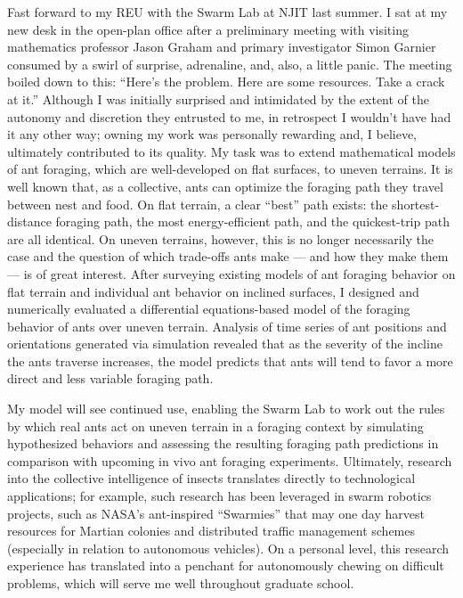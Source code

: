 \documentclass[12pt]{book}
\begin{document}
Fast forward to my REU with the Swarm Lab at NJIT last summer.
I sat at my new desk in the open-plan office after a preliminary meeting with visiting mathematics professor Jason Graham and primary investigator Simon Garnier consumed by a swirl of surprise, adrenaline, and, also, a little panic.
The meeting boiled down to this:
``Here's the problem.
Here are some resources.
Take a crack at it.''
Although I was initially surprised and intimidated by the extent of the autonomy and discretion they entrusted to me, in retrospect I wouldn't have had it any other way; owning my work was personally rewarding and, I believe, ultimately contributed to its quality.
My task was to extend mathematical models of ant foraging, which are well-developed on flat surfaces, to uneven terrains.
It is well known that, as a collective, ants can optimize the foraging path they travel between nest and food.
On flat terrain, a clear ``best'' path exists: the shortest-distance foraging path, the most energy-efficient path, and the quickest-trip path are all identical.
On uneven terrains, however, this is no longer necessarily the case and the question of which trade-offs ants make --- and how they make them --- is of great interest.
After surveying existing models of ant foraging behavior on flat terrain and individual ant behavior on inclined surfaces, I designed and numerically evaluated a differential equations-based model of the foraging behavior of ants over uneven terrain.
Analysis of time series of ant positions and orientations generated via simulation revealed that as the severity of the incline the ants traverse increases, the model predicts that ants will tend to favor a more direct and less variable foraging path.

My model will see continued use, enabling the Swarm Lab to work out the rules by which real ants act on uneven terrain in a foraging context by simulating hypothesized behaviors and assessing the resulting foraging path predictions in comparison with upcoming in vivo ant foraging experiments.
Ultimately, research into the collective intelligence of insects translates directly to technological applications; for example, such research has been leveraged in swarm robotics projects, such as NASA's ant-inspired ``Swarmies'' that may one day harvest resources for Martian colonies and distributed traffic management schemes (especially in relation to autonomous vehicles).
On a personal level, this research experience has translated into a penchant for autonomously chewing on difficult problems, which will serve me well throughout graduate school.
\end{document}

